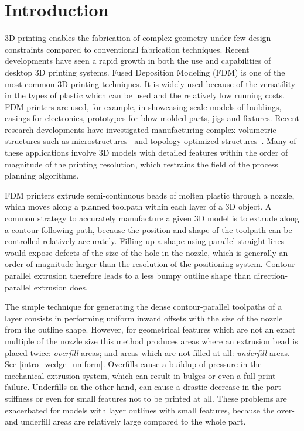 \section{Introduction}
3D printing enables the fabrication of complex geometry under few design constraints compared to conventional fabrication techniques.
Recent developments have seen a rapid growth in both the use and capabilities of desktop 3D printing systems.
Fused Deposition Modeling (FDM) is one of the most common 3D printing techniques.
It is widely used because of the versatility in the types of plastic which can be used and the relatively low running costs.
FDM printers are used, for example, in showcasing scale models of buildings, casings for electronics, prototypes for blow molded parts, jigs and fixtures.
Recent research developments have investigated manufacturing complex volumetric structures such as microstructures~\cite{bates2018compressive,Al-Ketan2018,Maskery2018} and topology optimized structures~\cite{Zegard2016SMO,Wu2019a,Cheng2019}.
Many of these applications involve 3D models with detailed features within the order of magnitude of the printing resolution, which restrains the field of the process planning algorithms.

FDM printers extrude semi-continuous beads of molten plastic through a nozzle, which moves along a planned toolpath within each layer of a 3D object.
A common strategy to accurately manufacture a given 3D model is to extrude along a contour-following path,
because the position and shape of the toolpath can be controlled relatively accurately.
Filling up a shape using parallel straight lines would expose defects of the size of the hole in the nozzle, which is generally an order of magnitude larger than the resolution of the positioning system.
Contour-parallel extrusion therefore leads to a less bumpy outline shape than direction-parallel extrusion does.


The simple technique for generating the dense contour-parallel toolpaths of a layer consists in performing uniform inward offsets with the size of the nozzle from the outline shape.
However, for geometrical features which are not an exact multiple of the nozzle size this method produces areas where an extrusion bead is placed twice: \emph{overfill} areas; and areas which are not filled at all: \emph{underfill} areas.
See \cref{intro_wedge_uniform}.
Overfills cause a buildup of pressure in the mechanical extrusion system, which can result in bulges or even a full print failure.
Underfills on the other hand, can cause a drastic decrease in the part stiffness or even for small features not to be printed at all.
These problems are exacerbated for models with layer outlines with small features, because the over- and underfill areas are relatively large compared to the whole part.

